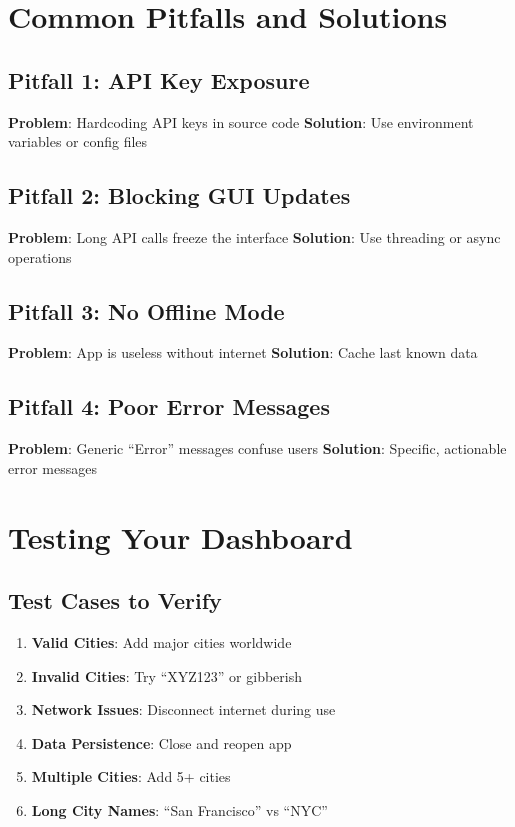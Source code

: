 \documentclass[
  letterpaper,
  DIV=11,
  numbers=noendperiod,
  oneside]{scrreprt}
\providecommand{\tightlist}{%
  \setlength{\itemsep}{0pt}\setlength{\parskip}{0pt}}\usepackage{longtable,booktabs,array}
\begin{document}
\section{Common Pitfalls and
Solutions}\label{common-pitfalls-and-solutions-3}

\subsection{Pitfall 1: API Key
Exposure}\label{pitfall-1-api-key-exposure}

\textbf{Problem}: Hardcoding API keys in source code \textbf{Solution}:
Use environment variables or config files

\subsection{Pitfall 2: Blocking GUI
Updates}\label{pitfall-2-blocking-gui-updates}

\textbf{Problem}: Long API calls freeze the interface \textbf{Solution}:
Use threading or async operations

\subsection{Pitfall 3: No Offline Mode}\label{pitfall-3-no-offline-mode}

\textbf{Problem}: App is useless without internet \textbf{Solution}:
Cache last known data

\subsection{Pitfall 4: Poor Error
Messages}\label{pitfall-4-poor-error-messages}

\textbf{Problem}: Generic ``Error'' messages confuse users
\textbf{Solution}: Specific, actionable error messages

\section{Testing Your Dashboard}\label{testing-your-dashboard}

\subsection{Test Cases to Verify}\label{test-cases-to-verify}

\begin{enumerate}
\def\labelenumi{\arabic{enumi}.}
\tightlist
\item
  \textbf{Valid Cities}: Add major cities worldwide
\item
  \textbf{Invalid Cities}: Try ``XYZ123'' or gibberish
\item
  \textbf{Network Issues}: Disconnect internet during use
\item
  \textbf{Data Persistence}: Close and reopen app
\item
  \textbf{Multiple Cities}: Add 5+ cities
\item
  \textbf{Long City Names}: ``San Francisco'' vs ``NYC''
\end{enumerate}
\end{document}
